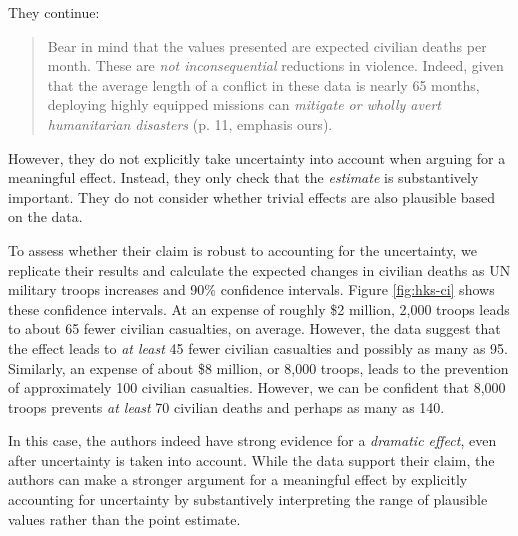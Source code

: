 \documentclass[12pt]{article}
\begin{document}
\noindent They continue:

\begin{quote}
Bear in mind that the values presented are expected civilian deaths per month. These are \emph{not inconsequential} reductions in violence. Indeed, given that the average length of a conflict in these data is nearly 65 months, deploying highly equipped missions can \emph{mitigate or wholly avert humanitarian disasters} (p. 11, emphasis ours).
\end{quote}

However, they do not explicitly take uncertainty into account when arguing for a meaningful effect. Instead, they only check that the \emph{estimate} is substantively important. They do not consider whether trivial effects are also plausible based on the data.

To assess whether their claim is robust to accounting for the uncertainty, we replicate their results and calculate the expected changes in civilian deaths as UN military troops increases and 90\% confidence intervals. Figure \ref{fig:hks-ci} shows these confidence intervals. At an expense of roughly \$2 million, 2,000 troops leads to about 65 fewer civilian casualties, on average. However, the data suggest that the effect leads to \textit{at least} 45 fewer civilian casualties and possibly as many as 95. Similarly, an expense of about \$8 million, or 8,000 troops, leads to the prevention of approximately 100 civilian casualties. However, we can be confident that 8,000 troops prevents \emph{at least} 70 civilian deaths and perhaps as many as 140. 

In this case, the authors indeed have strong evidence for a \emph{dramatic effect}, even after uncertainty is taken into account. While the data support their claim, the authors can make a stronger argument for a meaningful effect by explicitly accounting for uncertainty by substantively interpreting the range of plausible values rather than the point estimate.
\end{document}
